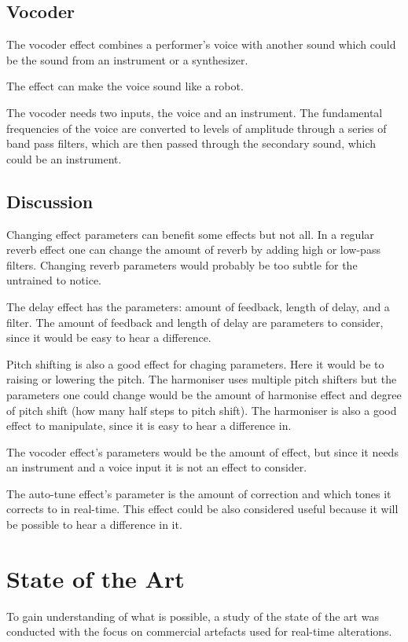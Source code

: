 \subsection{Vocoder}

The vocoder effect combines a performer's voice with another sound which could be the sound from an instrument or a synthesizer\citep{Vocoder_00}. 

The effect can make the voice sound like a robot. 

The vocoder needs two inputs, the voice and an instrument. The fundamental frequencies of the voice are converted to levels of amplitude through a series of band pass filters, which are then passed through the secondary sound, which could be an instrument.

\subsection{Discussion}

Changing effect parameters can benefit some effects but not all. In a regular reverb effect one can change the amount of reverb by adding high or low-pass filters. Changing reverb parameters would probably be too subtle for the untrained to notice.

The delay effect has the parameters: amount of feedback, length of delay, and a filter. The amount of feedback and length of delay are parameters to consider, since it would be easy to hear a difference. 

Pitch shifting is also a good effect for chaging parameters. Here it would be to raising or lowering the pitch. The harmoniser uses multiple pitch shifters but the parameters one could change would be the amount of harmonise effect and degree of pitch shift (how many half steps to pitch shift). The harmoniser is also a good effect to manipulate, since it is easy to hear a difference in. 
   
The vocoder effect's parameters would be the amount of effect, but since it needs an instrument and a voice input it is not an effect to consider. 

The auto-tune effect's parameter is the amount of correction and which tones it corrects to in real-time. This effect could be also considered useful because it will be possible to hear a difference in it. 


\section{State of the Art}
To gain understanding of what is possible, a study of the state of the art was conducted with the focus on commercial artefacts used for real-time alterations.

